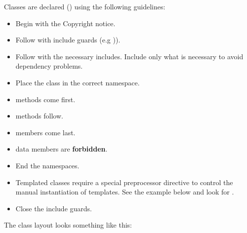 Classes are declared () using the following guidelines:
\begin{itemize}
\item Begin with the Copyright notice.
\item Follow with include guards (e.g )).
\item Follow with the necessary includes. Include only what is necessary to
avoid dependency problems.
\item Place the class in the correct namespace.
\item {} methods come first.
\item {} methods follow.
\item {} members come last.
\item {} data members are \textbf{forbidden}.
\item End the namespaces.
\item Templated classes require a special preprocessor directive to control the
manual instantiation of templates. See the example below and look for
.
\item Close the include guards.
\end{itemize}

The class layout looks something like this:

